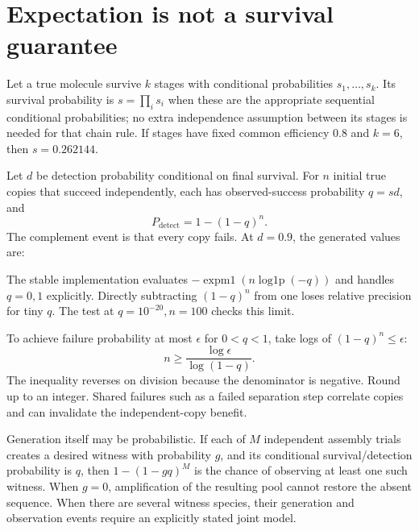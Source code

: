 \section{Expectation is not a survival guarantee}
Let a true molecule survive $k$ stages with conditional probabilities
$s_1,\ldots,s_k$. Its survival probability is
$s=\prod_i s_i$ when these are the appropriate sequential conditional
probabilities; no extra independence assumption between its stages is needed
for that chain rule. If stages have fixed common efficiency $0.8$ and $k=6$,
then $s=0.262144$.

Let $d$ be detection probability conditional on final survival. For $n$
initial true copies that succeed independently, each has observed-success
probability $q=sd$, and
\begin{equation}
 P_{\mathrm{detect}}=1-(1-q)^n.
\end{equation}
The complement event is that every copy fails. At $d=0.9$, the generated
values are:
\begin{center}\end{center}
The stable implementation evaluates
$-\operatorname{expm1}(n\operatorname{log1p}(-q))$ and handles $q=0,1$
explicitly. Directly subtracting $(1-q)^n$ from one loses relative precision
for tiny $q$. The test at $q=10^{-20},n=100$ checks this limit.

To achieve failure probability at most $\epsilon$ for $0<q<1$,
take logs of $(1-q)^n\le\epsilon$:
\begin{equation}
 n\ge \frac{\log\epsilon}{\log(1-q)}.
\end{equation}
The inequality reverses on division because the denominator is negative.
Round up to an integer. Shared failures such as a failed separation step
correlate copies and can invalidate the independent-copy benefit.

Generation itself may be probabilistic. If each of $M$ independent assembly
trials creates a desired witness with probability $g$, and its conditional
survival/detection probability is $q$, then
$1-(1-gq)^M$ is the chance of observing at least one such witness.
When $g=0$, amplification of the resulting pool cannot restore the absent
sequence. When there are several witness species, their generation and
observation events require an explicitly stated joint model.


